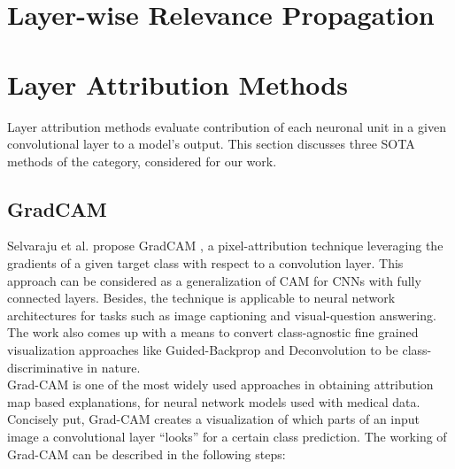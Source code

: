 \documentclass[../report.tex]{subfiles}
\begin{document}
\section{Layer-wise Relevance Propagation}







\section{Layer Attribution Methods}
Layer attribution methods evaluate contribution of each neuronal unit in a given convolutional layer to a model's output. This section discusses three SOTA methods of the category, considered for our work.
\subsection{GradCAM}
\label{sec_gradcam}
Selvaraju et al. propose GradCAM \cite{selvaraju2017grad}, a pixel-attribution technique leveraging the gradients of a given target class with respect to a convolution layer. This approach can be considered as a generalization of CAM for CNNs with fully connected layers. Besides, the technique is applicable to neural network architectures for tasks such as image captioning and visual-question answering. The work also comes up with a means to convert class-agnostic fine grained visualization approaches like Guided-Backprop and Deconvolution to be class-discriminative in nature.\\
Grad-CAM is one of the most widely used approaches in obtaining attribution map based explanations, for neural network models used with medical data. Concisely put, Grad-CAM creates a visualization of which parts of an input image a convolutional layer “looks” for a certain class prediction. The working of Grad-CAM can be described in the following steps:
\end{document}
